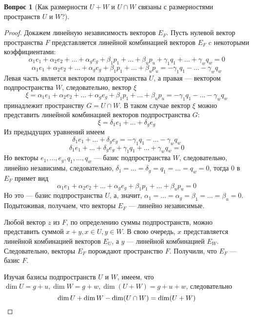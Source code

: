\documentclass[a4paper,11pt]{article}
\theoremstyle{remark}
\theoremstyle{definition}
\newtheorem{question}{Вопрос}
\numberwithin{question}{subsection}
\begin{document}
\begin{question}[Как размерности \(U + W\) и \(U \cap W\) связаны с размерностями пространств \(U\) и \(W\)?]
\begin{proof}
Докажем линейную независимость векторов \(E_F\). Пусть нулевой вектор пространства \(F\) представляется линейной комбинацией векторов \(E_F\) c некоторыми коэффициентами:
\begin{equation*}
	\alpha_1{}e_1 + \alpha_2{}e_2 + \dots + \alpha_g{}e_g + \beta_1{}p_1 + \dots + \beta_u{}p_u + \gamma_1{}q_1 + \dots + \gamma_w{}q_w = 0
\end{equation*}
\begin{equation*}
	\alpha_1{}e_1 + \alpha_2{}e_2 + \dots + \alpha_g{}e_g + \beta_1{}p_1 + \dots + \beta_u{}p_u = -\gamma_1{}q_1 - \dots - \gamma_w{}q_w
\end{equation*}
Левая часть является вектором подпространства \(U\), а правая --- вектором подпространства \(W\), следовательно, вектор \(\xi\)
\begin{equation*}
	\xi = \alpha_1{}e_1 + \alpha_2{}e_2 + \dots + \alpha_g{}e_g + \beta_1{}p_1 + \dots + \beta_u{}p_u = -\gamma_1{}q_1 - \dots - \gamma_w{}q_w	
\end{equation*}
принадлежит пространству \(G = U \cap W\). В таком случае вектор \(\xi\) можно представить линейной комбинацией векторов подпространства \(G\):
\begin{equation*}
	\xi = \delta_1{}e_1 + \dots + \delta_g{}e_g 	
\end{equation*}
Из предыдущих уравнений имеем
\begin{equation*}
	\delta_1{}e_1 + \dots + \delta_g{}e_g = -\gamma_1{}q_1 - \dots - \gamma_w{}q_w
\end{equation*}
\begin{equation*}
	\delta_1{}e_1 + \dots + \delta_g{}e_g + \gamma_1{}q_1 + \dots + \gamma_w{}q_w = 0
\end{equation*}
Но векторы \(e_1, \dots, e_g, q_1, \dots, q_w\) --- базис подпространства \(W\), следовательно, линейно независимы, следовательно, \(\delta_1 = \dots = \delta_g = q_1 = \dots = q_w = 0\), тогда \(0\) в \(E_F\) примет вид
\begin{equation*}
	\alpha_1{}e_1 + \alpha_2{}e_2 + \dots + \alpha_g{}e_g + \beta_1{}p_1 + \dots + \beta_u{}p_u = 0
\end{equation*}
Но это --- базис подпространства \(U\), а, значит, \(\alpha_1 = \dots = \alpha_g = \beta_1 = \dots = \beta_u = 0\). Подытоживая, получаем, что векторы \(E_F\) --- линейно независимые.

Любой вектор \(z\) из \(F\), по определению суммы подпространств, можно представить суммой \(x + y, x \in U, y \in W\). В свою очередь, \(x\) представляется линейной комбинацией векторов \(E_U\), а \(y\) --- линейной комбинацией \(E_W\). Следовательно, векторы \(E_F\) порождают пространство \(F\). Получили, что \(E_F\) --- базис \(F\).

Изучая базисы подпространств \(U\) и \(W\), имеем, что \(\dim U = g + u, \dim W = g + w, \dim (U + W) = g + u + w\), следовательно
\begin{equation*}
	\dim U + \dim W - \dim (U \cap W) = \dim (U + W) \qedhere
\end{equation*}
\end{proof}
\end{question}
\end{document}

